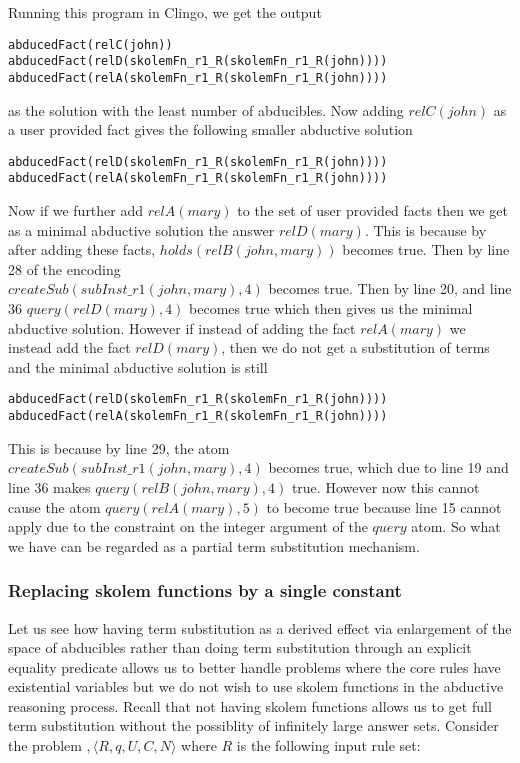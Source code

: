 Running this program in Clingo, we get the output 
\begin{lstlisting}[frame=none]
abducedFact(relC(john))
abducedFact(relD(skolemFn_r1_R(skolemFn_r1_R(john))))
abducedFact(relA(skolemFn_r1_R(skolemFn_r1_R(john))))    
\end{lstlisting}
as the solution with the least number of abducibles.
Now adding $relC(john)$ as a user provided fact gives the following smaller abductive solution
\begin{lstlisting}[frame=none]
abducedFact(relD(skolemFn_r1_R(skolemFn_r1_R(john))))
abducedFact(relA(skolemFn_r1_R(skolemFn_r1_R(john))))    
\end{lstlisting}
Now if we further add $relA(mary)$ to the set of user provided facts then we
get as a minimal abductive solution the answer $relD(mary)$. This is because
by after adding these facts, $holds(relB(john,mary))$ becomes true. Then by
line 28 of the encoding\\
$createSub(subInst\_r1(john,mary),4)$ becomes
true. Then by line 20, and line 36 $query(relD(mary),4)$ becomes true which
then gives us the minimal abductive solution. However if instead of adding
the fact $relA(mary)$ we instead add the fact $relD(mary)$, then we do not get
a  substitution of terms and the minimal abductive
solution is still
\begin{lstlisting}[frame=none]
abducedFact(relD(skolemFn_r1_R(skolemFn_r1_R(john))))
abducedFact(relA(skolemFn_r1_R(skolemFn_r1_R(john))))    
\end{lstlisting} 
This is because by line 29, the atom\\ $createSub(subInst\_r1(john,mary),4)$ becomes true,
which due to line 19 and line 36 makes $query(relB(john,mary),4)$
true. However now this cannot cause the atom $query(relA(mary),5)$ to become
true because line 15 cannot apply due to the constraint on the integer
argument of the $query$ atom. So what we have can be regarded as a partial
term substitution mechanism.


\subsubsection{Replacing skolem functions by a single constant}

Let us see how having term substitution as a derived effect via enlargement of
the space of abducibles rather than doing term substitution through an
explicit equality predicate allows us to better handle problems where the core
rules have existential variables but we do not wish to use skolem functions in
the abductive reasoning process. Recall that not having skolem functions
allows us to get full term substitution without the possiblity of infinitely
large answer sets. Consider the problem $,\langle R,q,U,C,N \rangle$ where $R$ is the
following input rule set: 

